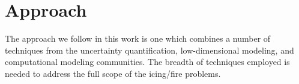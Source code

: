 \section{Approach}
\label{sec:introduction:approach}

The approach we follow in this work is one which combines a number of
techniques from the uncertainty quantification, low-dimensional
modeling, and computational modeling communities. The breadth of
techniques employed is needed to address the full scope of the
icing/fire problems.
